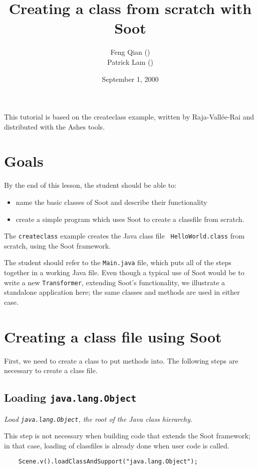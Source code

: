 \documentclass{article}
\title{Creating a class from scratch with Soot}
\author{Feng Qian (\htmladdnormallink{fqian@sable.mcgill.ca}{mailto:fqian@sable.mcgill.ca}) \\ Patrick Lam (\htmladdnormallink{plam@sable.mcgill.ca}{mailto:plam@sable.mcgill.ca})}
\date{September 1, 2000}
\begin{document}
\maketitle

This tutorial is based on the createclass example, written by
Raja-Vall\'ee-Rai and distributed with the Ashes tools.

\section{Goals}
By the end of this lesson, the student should be able to:
\begin{itemize}
\item name the basic classes of Soot and describe their functionality
\item create a simple program which uses Soot to create a classfile from scratch.
\end{itemize}

The {\tt createclass} example creates the Java class file {\tt
HelloWorld.class} from scratch, using the Soot framework.

The student should refer to the {\tt Main.java} file, which
puts all of the steps together in a working Java file.  Even though 
a typical use of Soot would be to write a new {\tt Transformer}, extending
Soot's functionality, we illustrate a standalone application here;
the same classes and methods are used in either case.

\section{Creating a class file using Soot}

First, we need to create a class to put methods into.
The following steps are necessary to create a class file.

\subsection{Loading {\tt java.lang.Object}}

{\em Load {\tt java.lang.Object}, the root of the Java class 
hierarchy.}

This step is not necessary when building code that extends the
Soot framework; in that case, loading of classfiles is already done
when user code is called.

\noindent
\begin{verbatim}    Scene.v().loadClassAndSupport("java.lang.Object"); \end{verbatim}
\end{document}
